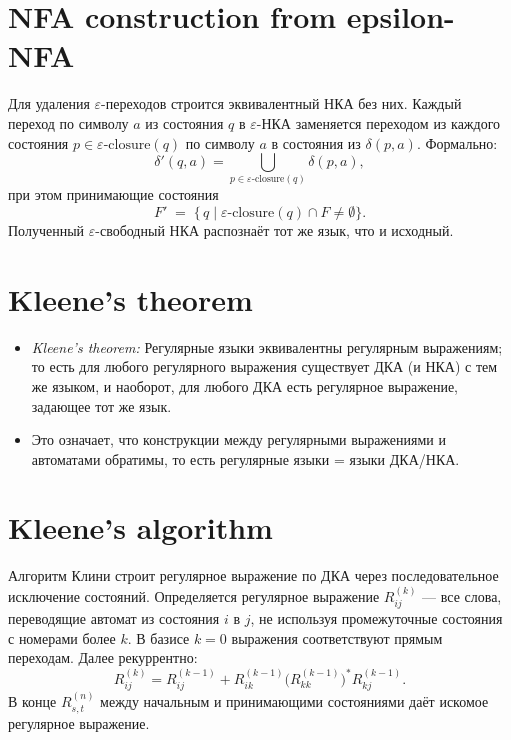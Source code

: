 \documentclass{article}
\begin{document}
\section{NFA construction from epsilon-NFA}
Для удаления $\varepsilon$-переходов строится эквивалентный НКА без них. Каждый переход по символу $a$ из состояния $q$ в $\varepsilon$-НКА заменяется переходом из каждого состояния $p\in\varepsilon\text{-closure}(q)$ по символу $a$ в состояния из $\delta(p,a)$. Формально: 
\[
\delta'(q,a) = \bigcup_{p\in\varepsilon\text{-closure}(q)}\delta(p,a),
\]
при этом принимающие состояния 
\[
F' \;=\; \{\,q \mid \varepsilon\text{-closure}(q)\cap F\neq\emptyset\}.
\]
Полученный $\varepsilon$-свободный НКА распознаёт тот же язык, что и исходный.

\section{Kleene’s theorem}
\begin{itemize}
	\item \textit{Kleene’s theorem:} Регулярные языки эквивалентны регулярным выражениям; то есть для любого регулярного выражения существует ДКА (и НКА) с тем же языком, и наоборот, для любого ДКА есть регулярное выражение, задающее тот же язык.
	\item Это означает, что конструкции между регулярными выражениями и автоматами обратимы, то есть регулярные языки = языки ДКА/НКА.
\end{itemize}

\section{Kleene’s algorithm}
Алгоритм Клини строит регулярное выражение по ДКА через последовательное исключение состояний. Определяется регулярное выражение $R_{ij}^{(k)}$ --- все слова, переводящие автомат из состояния $i$ в $j$, не используя промежуточные состояния с номерами более $k$. В базисе $k=0$ выражения соответствуют прямым переходам. Далее рекуррентно:
\[
R_{ij}^{(k)} = R_{ij}^{(k-1)} + R_{ik}^{(k-1)} \bigl(R_{kk}^{(k-1)}\bigr)^* R_{kj}^{(k-1)}.
\]
В конце $R_{s,t}^{(n)}$ между начальным и принимающими состояниями даёт искомое регулярное выражение.
\end{document}
